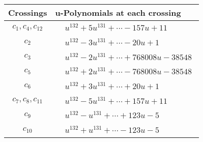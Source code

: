 \documentclass[1p]{elsarticle_modified}
\theoremstyle{definition}
\begin{document}
\begin{tabular}{m{50pt}|m{274pt}}
Crossings & \hspace{64pt}u-Polynomials at each crossing \\
\hline $$\begin{aligned}c_{1},c_{4},c_{12}\end{aligned}$$&$\begin{aligned}
&u^{132}+5 u^{131}+\cdots-157 u+11
\end{aligned}$\\
\hline $$\begin{aligned}c_{2}\end{aligned}$$&$\begin{aligned}
&u^{132}-3 u^{131}+\cdots-20 u+1
\end{aligned}$\\
\hline $$\begin{aligned}c_{3}\end{aligned}$$&$\begin{aligned}
&u^{132}-2 u^{131}+\cdots+768008 u-38548
\end{aligned}$\\
\hline $$\begin{aligned}c_{5}\end{aligned}$$&$\begin{aligned}
&u^{132}+2 u^{131}+\cdots-768008 u-38548
\end{aligned}$\\
\hline $$\begin{aligned}c_{6}\end{aligned}$$&$\begin{aligned}
&u^{132}+3 u^{131}+\cdots+20 u+1
\end{aligned}$\\
\hline $$\begin{aligned}c_{7},c_{8},c_{11}\end{aligned}$$&$\begin{aligned}
&u^{132}-5 u^{131}+\cdots+157 u+11
\end{aligned}$\\
\hline $$\begin{aligned}c_{9}\end{aligned}$$&$\begin{aligned}
&u^{132}- u^{131}+\cdots+123 u-5
\end{aligned}$\\
\hline $$\begin{aligned}c_{10}\end{aligned}$$&$\begin{aligned}
&u^{132}+u^{131}+\cdots-123 u-5
\end{aligned}$\\
\hline
\end{tabular}\\~\\
\end{document}
